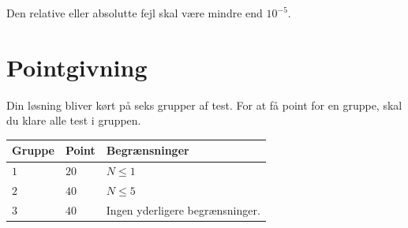 Den relative eller absolutte fejl skal være mindre end $10^{-5}$.

\section*{Pointgivning}
Din løsning bliver kørt på seks grupper af test. For at få point for en gruppe, skal du klare alle test i gruppen.

\noindent
\begin{tabular}{| l | l | p{12cm} |}
  \hline
  Gruppe & Point & Begrænsninger \\ \hline
  $1$    & $20$        & $N \le 1$ \\ \hline 
  $2$    & $40$        & $N \le 5$ \\ \hline
  $3$    & $40$        & Ingen yderligere begrænsninger. \\ \hline 
\end{tabular}
